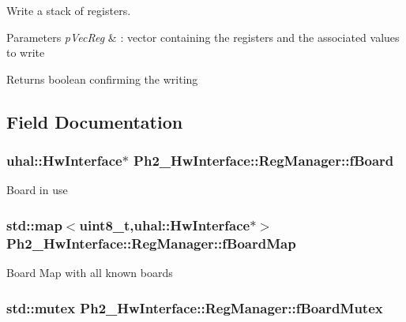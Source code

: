Write a stack of registers. 


\begin{DoxyParams}{Parameters}
{\em p\-Vec\-Reg} & \-: vector containing the registers and the associated values to write \\
\hline
\end{DoxyParams}
\begin{DoxyReturn}{Returns}
boolean confirming the writing 
\end{DoxyReturn}


\subsection{Field Documentation}
\hypertarget{class_ph2___hw_interface_1_1_reg_manager_a0d4908ec834a3a0b7d8139872fd0a4a0}{
\subsubsection[{f\-Board}]{\setlength{\rightskip}{0pt plus 5cm}uhal\-::\-Hw\-Interface$\ast$ Ph2\-\_\-\-Hw\-Interface\-::\-Reg\-Manager\-::f\-Board\hspace{0.3cm}{\ttfamily [protected]}}}\label{class_ph2___hw_interface_1_1_reg_manager_a0d4908ec834a3a0b7d8139872fd0a4a0}
Board in use \hypertarget{class_ph2___hw_interface_1_1_reg_manager_a9c34ffe467a572796c05036533bb6d39}{
\subsubsection[{f\-Board\-Map}]{\setlength{\rightskip}{0pt plus 5cm}std\-::map$<$uint8\-\_\-t,uhal\-::\-Hw\-Interface$\ast$$>$ Ph2\-\_\-\-Hw\-Interface\-::\-Reg\-Manager\-::f\-Board\-Map\hspace{0.3cm}{\ttfamily [protected]}}}\label{class_ph2___hw_interface_1_1_reg_manager_a9c34ffe467a572796c05036533bb6d39}
Board Map with all known boards \hypertarget{class_ph2___hw_interface_1_1_reg_manager_ab5fdbe722820897d3a1344f300cc4a92}{
\subsubsection[{f\-Board\-Mutex}]{\setlength{\rightskip}{0pt plus 5cm}std\-::mutex Ph2\-\_\-\-Hw\-Interface\-::\-Reg\-Manager\-::f\-Board\-Mutex\hspace{0.3cm}{\ttfamily [protected]}}}\label{class_ph2___hw_interface_1_1_reg_manager_ab5fdbe722820897d3a1344f300cc4a92}
